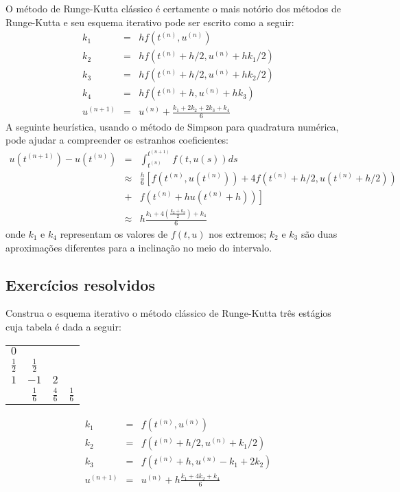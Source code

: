 O método de Runge-Kutta clássico é certamente o mais notório dos métodos de Runge-Kutta e seu esquema iterativo pode ser escrito como a seguir:
\begin{eqnarray}
k_1&=&hf\left(t^{(n)},u^{(n)}\right)\\
k_2&=&hf\left(t^{(n)}+h/2,u^{(n)}+hk_1/2\right)\\
k_3&=&hf\left(t^{(n)}+h/2,u^{(n)}+hk_2/2\right)\\
k_4&=&hf\left(t^{(n)}+h,u^{(n)}+hk_3\right)\\
u^{(n+1)}&=&u^{(n)}+\frac{k_1+2k_2+2k_3+k_4}{6}
\end{eqnarray}
A seguinte heurística, usando o método de Simpson para quadratura numérica, pode ajudar a compreender os estranhos coeficientes:
\begin{eqnarray}
u({t^{(n+1)}})-u({t^{(n)}})&=&\int_{t^{(n)}}^{t^{(n+1)}}f(t,u(s))ds \\
&\approx& \frac{h}{6}\left[ f\left(t^{(n)},u(t^{(n)})\right)+4f\left(t^{(n)}+h/2,u(t^{(n)}+h/2)\right)\right.\\
&+&\left.f\left(t^{(n)}+hu(t^{(n)}+h)\right)\right]\\
&\approx& h\frac{k_1+4(\frac{k_2+k_3}{2})+k_4}{6}
\end{eqnarray}
onde $k_1$ e $k_4$ representam os valores de $f(t,u)$ nos extremos; $k_2$ e $k_3$ são duas aproximações diferentes para a inclinação no meio do intervalo.

\subsection*{Exercícios resolvidos}
\begin{exeresol}\label{exeresol:problema_resolvido_RK3} Construa o esquema iterativo o método clássico de Runge-Kutta três estágios cuja tabela é dada a seguir:

\begin{tabular}{c|ccc}
  $0$           &               &               & \\
  $\frac{1}{2}$ & $\frac{1}{2}$ &               & \\
  $1$           & $-1$          & $2$           & \\  \hline
                & $\frac{1}{6}$ & $\frac{4}{6}$ & $\frac{1}{6}$
\end{tabular}

\end{exeresol}
\begin{resol}
 \begin{eqnarray}
    k_1&=&f\left(t^{(n)},u^{(n)}\right)\\
    k_2&=&f\left(t^{(n)}+h/2,u^{(n)}+k_1/2\right)\\
    k_3&=&f\left(t^{(n)}+h,u^{(n)}-k_1+2k_2\right)\\
  u^{(n+1)}&=&u^{(n)}+h\frac{k_1+4k_2+k_4}{6}
 \end{eqnarray}
\end{resol}

